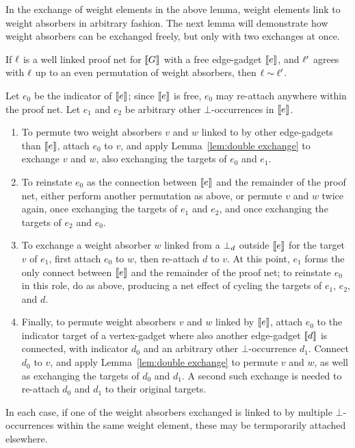 \documentclass[conference]{IEEEtran}
\begin{document}
In the exchange of weight elements in the above lemma, weight elements link to weight absorbers in arbitrary fashion.
%
The next lemma will demonstrate how weight absorbers can be exchanged freely, but only with two exchanges at once. 



\begin{lemma}
\label{lem:permute weight absorbers}
If $\ell$ is a well linked proof net for $\llbracket G\rrbracket$ with a free edge-gadget $\llbracket e\rrbracket$, and $\ell'$ agrees with $\ell$ up to an even permutation of weight absorbers, then $\links\perm\links'$.
\end{lemma}

\begin{IEEEproof}
Let $e_0$ be the indicator of $\llbracket e\rrbracket$; since $\llbracket e\rrbracket$ is free, $e_0$ may re-attach anywhere within the proof net.
%
Let $e_1$ and $e_2$ be arbitrary other $\bot$-occurrences in $\llbracket e\rrbracket$.

\begin{enumerate}

	\item
To permute two weight absorbers $v$ and $w$ linked to by other edge-gadgets than $\llbracket e\rrbracket$, attach $e_0$ to $v$, and apply Lemma~\ref{lem:double exchange} to exchange $v$ and $w$, also exchanging the targets of $e_0$ and $e_1$.

	\item
To reinstate $e_0$ as the connection between $\llbracket e\rrbracket$ and the remainder of the proof net, either perform another permutation as above, or permute $v$ and $w$ twice again, once exchanging the targets of $e_1$ and $e_2$, and once exchanging the targets of $e_2$ and $e_0$.

	\item
To exchange a weight absorber $w$ linked from a $\bot_{d}$ outside $\llbracket e\rrbracket$ for the target $v$ of $e_1$, first attach $e_0$ to $w$, then re-attach $d$ to $v$.
%
At this point, $e_1$ forms the only connect between $\llbracket e\rrbracket$ and the remainder of the proof net; to reinstate $e_0$ in this role, do as above, producing a net effect of cycling the targets of $e_1$, $e_2$, and $d$.

	\item
Finally, to permute weight absorbers $v$ and $w$ linked by $\llbracket e\rrbracket$, attach $e_0$ to the indicator target of a vertex-gadget where also another edge-gadget $\llbracket d\rrbracket$ is connected, with indicator $d_0$ and an arbitrary other $\bot$-occurrence $d_1$.
%
Connect $d_0$ to $v$, and apply Lemma~\ref{lem:double exchange} to permute $v$ and $w$, as well as exchanging the targets of $d_0$ and $d_1$.
%
A second such exchange is needed to re-attach $d_0$ and $d_1$ to their original targets.

\end{enumerate}

In each case, if one of the weight absorbers exchanged is linked to by multiple $\bot$-occurrences within the same weight element, these may be termporarily attached elsewhere.

\end{IEEEproof}
\end{document}
